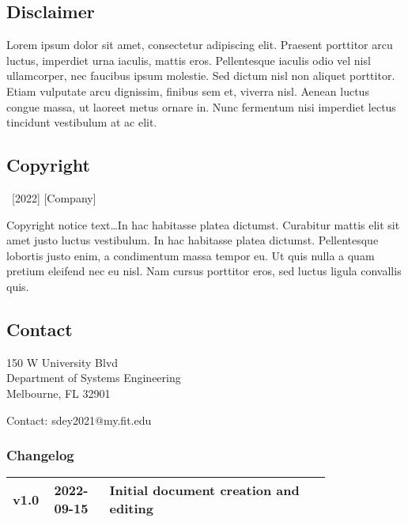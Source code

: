 \thispagestyle{empty} %

\begin{twothirdswidth} %
\footnotesize %

\subsection*{Disclaimer}

Lorem ipsum dolor sit amet, consectetur adipiscing elit. Praesent porttitor arcu luctus, imperdiet urna iaculis, mattis eros. Pellentesque iaculis odio vel nisl ullamcorper, nec faucibus ipsum molestie. Sed dictum nisl non aliquet porttitor. Etiam vulputate arcu dignissim, finibus sem et, viverra nisl. Aenean luctus congue massa, ut laoreet metus ornare in. Nunc fermentum nisi imperdiet lectus tincidunt vestibulum at ac elit.

\subsection*{Copyright}

\textcopyright~[2022] [Company] 

Copyright notice text\ldots In hac habitasse platea dictumst. Curabitur mattis elit sit amet justo luctus vestibulum. In hac habitasse platea dictumst. Pellentesque lobortis justo enim, a condimentum massa tempor eu. Ut quis nulla a quam pretium eleifend nec eu nisl. Nam cursus porttitor eros, sed luctus ligula convallis quis.

\subsection*{Contact}

150 W University Blvd\\
Department of Systems Engineering\\
Melbourne, FL 32901

Contact: sdey2021@my.fit.edu

\vfill %

\subsubsection*{Changelog}

\scriptsize %

\begin{tabular}{@{} L{0.05\linewidth} L{0.15\linewidth} L{0.6\linewidth} @{}} %
	\toprule
	v1.0 & 2022-09-15 & Initial document creation and editing\\
	\bottomrule
\end{tabular}
\end{twothirdswidth}